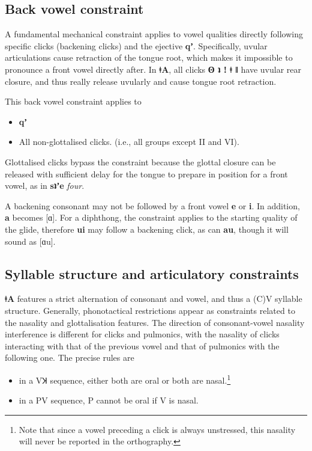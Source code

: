 \documentclass[11pt,a5paper]{book}
\newcommand{\qcn}[1]{\textcolor{AccentText}{\large\textbf{#1}}}
\newcommand{\langname}{\qcn{ǂA}}
\newcommand{\transl}[2]{\qcn{#1} \emph{#2}}
\begin{document}
\subsection{Back vowel constraint}\label{sec:backvowelconstraint}

A fundamental mechanical constraint applies to vowel qualities directly following specific clicks (backening clicks) and the ejective \qcn{qʼ}. Specifically, uvular articulations cause retraction of the tongue root, which makes it impossible to pronounce a front vowel directly after. In \langname, all clicks \qcn{ʘ ʇ ǃ ǂ ǁ} have uvular rear closure, and thus really release uvularly and cause tongue root retraction.

This back vowel constraint applies to

\begin{itemize}
	\item \qcn{qʼ}
	\item All non-glottalised clicks. (i.e., all groups except II and VI).
\end{itemize}

Glottalised clicks bypass the constraint because the glottal closure can be released with sufficient delay for the tongue to prepare in position for a front vowel, as in \transl{sʇʼe}{four}.

A backening consonant may not be followed by a front vowel \qcn{e} or \qcn{i}. In addition, \qcn{a} becomes [ɑ].  For a diphthong, the constraint applies to the starting quality of the glide, therefore \qcn{ui} may follow a backening click, as can \qcn{au}, though it will sound as [ɑu].

\subsection{Syllable structure and articulatory constraints}\label{sec:syllables}

\langname{} features a strict alternation of consonant and vowel, and thus a (C)V syllable structure. Generally, phonotactical restrictions appear as constraints related to the nasality and glottalisation features. The direction of consonant-vowel nasality interference is different for clicks and pulmonics, with the nasality of clicks interacting with that of the previous vowel and that of pulmonics with the following one. The precise rules are

\begin{itemize}
	\item in a VꞰ sequence, either both are oral or both are nasal.\footnote{Note that since a vowel preceding a click is always unstressed, this nasality will never be reported in the orthography.}
	\item in a PV sequence, P cannot be oral if V is nasal.
\end{itemize}
\end{document}
